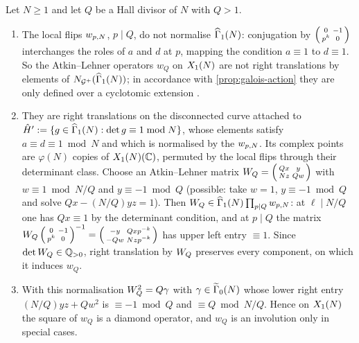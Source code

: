 \begin{example}
\label{ex:al-x1}
Let $N \geq 1$ and let $Q$ be a Hall divisor of $N$ with $Q > 1$.
\begin{enumerate}
\item The local flips $w_{p,N}$, $p \mid Q$, do not normalise
  $\GammaOne[ad]{N}$: conjugation by $\left(\begin{smallmatrix} 0 & -1 \\ p^{k} & 0 \end{smallmatrix}\right)$ interchanges
  the roles of $a$ and $d$ at $p$, mapping the condition $a \equiv 1$ to
  $d \equiv 1$. So the Atkin--Lehner operators $w_Q$ on $X_{1}(N)$ are
  not right translations by elements of $\Normalizer{\AdelicGroup}{\GammaOne[ad]{N}}$;
  in accordance with \cref{prop:galois-action} they are only defined over
  a cyclotomic extension \cite[Rem.~7.3.2]{DiamondIm1995}.
\item They are right translations on the disconnected curve attached to
  $\hat H' := \{g \in \GammaOne[ad]{N} : \det g \equiv 1 \bmod N\}$, whose
  elements satisfy $a \equiv d \equiv 1 \bmod N$ and which is normalised by
  the $w_{p,N}$. Its complex points are $\varphi(N)$ copies of
  $X_{1}(N)(\mathbb{C})$, permuted by the local flips through their
  determinant class. Choose an Atkin--Lehner matrix
  $W_{Q} = \left(\begin{smallmatrix} Qx & y \\ Nz & Qw \end{smallmatrix}\right)$ with $w \equiv 1 \bmod N/Q$ and
  $y \equiv -1 \bmod Q$ (possible: take $w = 1$, $y \equiv -1 \bmod Q$ and
  solve $Qx - (N/Q)yz = 1$). Then
  $\ALmatrix{Q} \in \GammaOne[ad]{N}\prod_{p\mid Q}\ALflip{p,N}$:
  at $\ell \mid N/Q$ one has $Qx \equiv 1$ by the determinant condition, and
  at $p \mid Q$ the matrix $W_{Q}\left(\begin{smallmatrix} 0 & -1 \\ p^{k} & 0 \end{smallmatrix}\right)^{-1} =
  \left(\begin{smallmatrix} -y & Qxp^{-k} \\ -Qw & Nzp^{-k} \end{smallmatrix}\right)$ has upper left entry $\equiv 1$.
  Since $\det W_{Q} \in \mathbb{Q}_{>0}$, right translation by
  $W_{Q}$ preserves every component, on which it induces $w_Q$.
\item With this normalisation $W_{Q}^{2} = Q\gamma$ with
  $\gamma \in \GammaZero[lift]{N}$ whose lower right entry
  $(N/Q)yz + Qw^{2}$ is $\equiv -1 \bmod Q$ and $\equiv Q \bmod N/Q$. Hence
  on $X_{1}(N)$ the square of $w_Q$ is a diamond operator, and $w_Q$
  is an involution only in special cases.
\end{enumerate}
\end{example}

